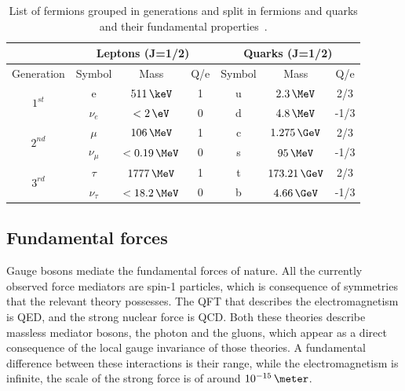 \begin{table}[!htb]
\centering
\begin{tabular}{|c||c|c|c||c|c|c|}
\hline
 & \multicolumn{3}{c||}{Leptons (J=1/2)} & \multicolumn{3}{c|}{Quarks (J=1/2)} \\
\hline
Generation                &     Symbol &            Mass & Q/e & Symbol &           Mass & Q/e \\
\hline\hline
\multirow{2}{*}{$1^{st}$} & e          &     $511\,\keV$ &   1 &      u &    $2.3\,\MeV$ &  2/3 \\
                          & $\nu_e$    &     $< 2\, \eV$ &   0 &      d &    $4.8\,\MeV$ & -1/3 \\
\hline
\hline
\multirow{2}{*}{$2^{nd}$} & $\mu$      &  $   106\,\MeV$ &   1 &      c &  $1.275\,\GeV$ &  2/3 \\
                          & $\nu_\mu$  &  $< 0.19\,\MeV$ &   0 &      s &     $95\,\MeV$ & -1/3 \\
\hline
\hline
\multirow{2}{*}{$3^{rd}$} & $\tau$     & $   1777\,\MeV$ &   1 &      t & $173.21\,\GeV$ &  2/3 \\
                          & $\nu_\tau$ & $< 18.2 \,\MeV$ &   0 &      b &   $4.66\,\GeV$ & -1/3 \\
\hline
\end{tabular}
\caption[List of leptons and their fundamental properties]
{List of fermions grouped in generations and split in fermions and quarks and their fundamental properties~\cite{ARTICLE:PDG2014}.}
\label{TABLE:Theory_SM_ParticlesAndForces_MatterParticle}
\end{table}

\subsection{Fundamental forces}
\label{SUBSECTION:Theory_SM_FundamentalForces}


Gauge bosons mediate the fundamental forces of nature. All the currently observed force mediators are spin-1 particles, which is consequence of symmetries that the relevant theory possesses. The \gls{QFT} that describes the electromagnetism is \gls{QED}, and the strong nuclear force is \gls{QCD}. Both these theories describe massless mediator bosons, the photon and the gluons, which appear as a direct consequence of the local gauge invariance of those theories. A fundamental difference between these interactions is their range, while the electromagnetism is infinite, the scale of the strong force is of around $10^{-15}\,\meter$.

